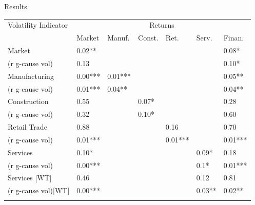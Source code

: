 \documentclass[11pt]{beamer}
\begin{document}
\begin{frame}{Results}
\centering
\begin{table}\scriptsize
\begin{tabular}{lllllll}
\cline{1-7}
Volatility Indicator & \multicolumn{6}{c}{Returns}\\  \cline{2-7}
& Market & Manuf. & Const. & Ret. & Serv. & Finan. \\ 
\cline{1-7}
Market & 0.02{**} &  &  &  &  & 0.08{*} \\
(r g-cause vol) & 0.13 &  &  &  &  & 0.10{*}\\
Manufacturing & 0.00{***} & 0.01{***} &  &  &  & 0.05{**} \\
(r g-cause vol) & 0.01{***} & 0.04{**} &  &  &  & 0.04{**} \\
Construction & 0.55 &  & 0.07{*} &  &  & 0.28 \\
(r g-cause vol) & 0.32 &  & 0.10{*} &  &  & 0.60 \\
Retail Trade & 0.88 &  &  & 0.16 &  & 0.70 \\
(r g-cause vol) & 0.01{***} &  &  & 0.01{***} &  & 0.01{***} \\
Services & 0.10{*} &  &  &  & 0.09{*} & 0.18 \\
(r g-cause vol)& 0.00{***} &  &  &  & 0.1{*} & 0.01{***} \\
Services [WT] & 0.46 &  &  &  & 0.12 & 0.81\\
(r g-cause vol)[WT] & 0.00{***} &  &  &  & 0.03{**} & 0.02{**} \\
\cline{1-7}\\
\end{tabular}
\end{table}
\end{frame}
\end{document}
